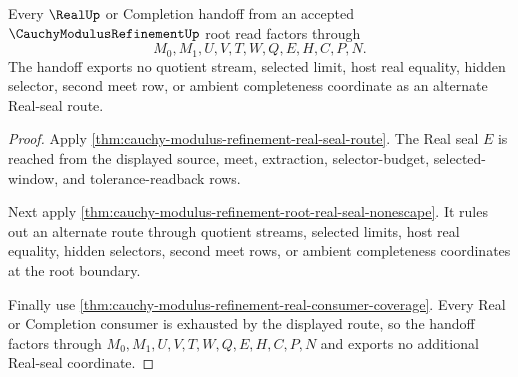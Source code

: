\begin{theorem}
\label{thm:cauchy-modulus-refinement-real-seal-root-handoff}
Every $\RealUp$ or Completion handoff from an accepted $\CauchyModulusRefinementUp$ root read factors through
$$
M_0,M_1,U,V,T,W,Q,E,H,C,P,N.
$$
The handoff exports no quotient stream, selected limit, host real equality, hidden selector, second meet row, or ambient completeness coordinate as an alternate Real-seal route.
\end{theorem}
\begin{proof}
Apply \autoref{thm:cauchy-modulus-refinement-real-seal-route}. The Real seal $E$ is reached from the displayed source, meet, extraction, selector-budget, selected-window, and tolerance-readback rows.

Next apply \autoref{thm:cauchy-modulus-refinement-root-real-seal-nonescape}. It rules out an alternate route through quotient streams, selected limits, host real equality, hidden selectors, second meet rows, or ambient completeness coordinates at the root boundary.

Finally use \autoref{thm:cauchy-modulus-refinement-real-consumer-coverage}. Every Real or Completion consumer is exhausted by the displayed route, so the handoff factors through $M_0,M_1,U,V,T,W,Q,E,H,C,P,N$ and exports no additional Real-seal coordinate.
\end{proof}

